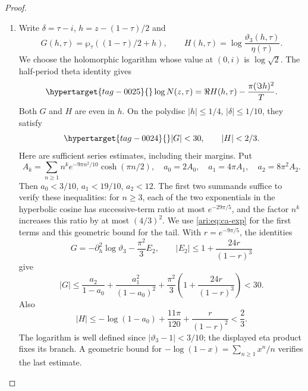 \begin{proof}
\begin{enumerate}[label=\arabic*.,leftmargin=*]
\item Write $\delta=\tau-i$, $h=z-(1-\tau)/2$ and
\[
 G(h,\tau)=\wp_\tau((1-\tau)/2+h),\qquad
 H(h,\tau)=\log\frac{\vartheta_3(h,\tau)}{\eta(\tau)}.
\]
We choose the holomorphic logarithm whose value at $(0,i)$ is
$\log\sqrt2$. The half-period theta identity gives
\begin{equation}\hypertarget{tag-0025}{}\label{ari:eq:ca-H}
 \log N(z,\tau)=\Re H(h,\tau)-\frac{\pi(\Im h)^2}{T}.
\end{equation}
Both $G$ and $H$ are even in $h$. On the polydisc
$|h|\le1/4$, $|\delta|\le1/10$, they satisfy
\begin{equation}\hypertarget{tag-0024}{}\label{ari:eq:ca-GHbounds}
 |G|<30,\qquad |H|<2/3.
\end{equation}
Here are sufficient series estimates, including their margins.
Put
\[
 A_k=\sum_{n\ge1}n^k e^{-9\pi n^2/10}\cosh(\pi n/2),
 \quad a_0=2A_0,\quad a_1=4\pi A_1,\quad a_2=8\pi^2A_2.
\]
Then $a_0<3/10$, $a_1<19/10$, $a_2<12$.
The first two summands suffice to verify these inequalities: for
$n\ge3$, each of the two exponentials in the hyperbolic cosine
has successive-term ratio at most $e^{-29\pi/5}$, and the
factor $n^k$ increases this ratio by at most $(4/3)^2$.
We use \eqref{ari:eq:ca-exp} for the first terms and this geometric
bound for the tail. With $r=e^{-9\pi/5}$, the identities
\[
 G=-\partial_h^2\log\vartheta_3-\frac{\pi^2}{3}E_2,
 \qquad
 |E_2|\le1+\frac{24r}{(1-r)^3}
\]
give
\[
 |G|\le\frac{a_2}{1-a_0}+\frac{a_1^2}{(1-a_0)^2}
       +\frac{\pi^2}{3}\left(1+\frac{24r}{(1-r)^3}\right)<30.
\]
Also
\[
 |H|\le-\log(1-a_0)+\frac{11\pi}{120}
                    +\frac{r}{(1-r)^2}<\frac23.
\]
The logarithm is well defined since $|\vartheta_3-1|<3/10$;
the displayed eta product fixes its branch. A geometric bound
for $-\log(1-x)=\sum_{n\ge1}x^n/n$ verifies the last estimate.


\end{enumerate}
\end{proof}
